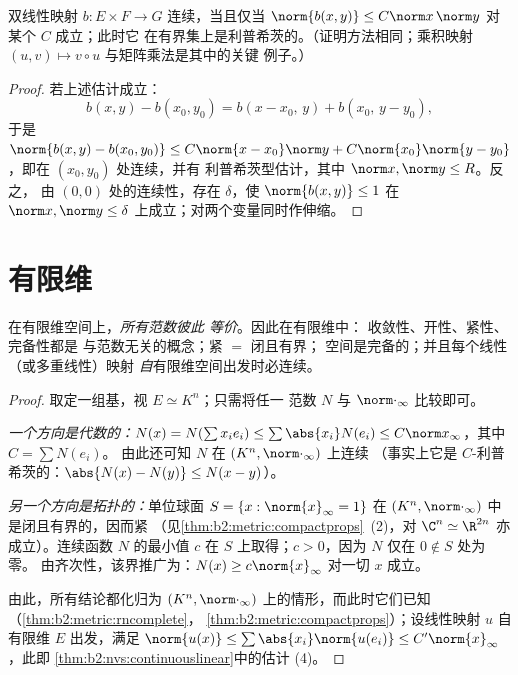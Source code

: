 \begin{proposition}[双线性映射]\label{prop:b2:nvs:bilinear}
双线性映射 $b \colon E \times F \to G$ 连续，当且仅当
$\norm{b(x,y)} \leq C\norm x\,\norm y$ 对某个 $C$ 成立；此时它
在有界集上是利普希茨的。（证明方法相同；乘积映射
$(u, v) \mapsto v \circ u$ 与矩阵乘法是其中的关键
例子。）
\end{proposition}

\begin{proof}
若上述估计成立：
\[
b(x,y) - b(x_0,y_0) = b(x - x_0,\, y) + b(x_0,\, y - y_0),
\]
于是 $\norm{b(x,y) - b(x_0,y_0)} \leq C\norm{x - x_0}\norm y +
C\norm{x_0}\norm{y - y_0}$，即在 $(x_0, y_0)$ 处连续，并有
利普希茨型估计，其中 $\norm x, \norm y \leq R$。反之，
由 $(0,0)$ 处的连续性，存在 $\delta$，使 $\norm{b(x,y)} \leq 1$ 在
$\norm x, \norm y \leq \delta$ 上成立；对两个变量同时作伸缩。
\end{proof}

\section{有限维}

\begin{theorem}[有限维空间中范数的等价性]\label{thm:b2:nvs:finitedim}
在有限维空间上，\emph{所有范数彼此
等价}。因此在有限维中：
收敛性、开性、紧性、完备性都是
与范数无关的概念；紧 $=$ 闭且有界；
空间是完备的；并且每个线性（或多重线性）映射
\emph{自}有限维空间出发时必连续。
\end{theorem}

\begin{proof}
取定一组基，视 $E \simeq K^n$；只需将任一
范数 $N$ 与 $\norm\cdot_\infty$ 比较即可。

\emph{一个方向是代数的：}$N(x) = N(\sum x_i e_i) \leq
\sum \abs{x_i} N(e_i) \leq C \norm x_\infty$，其中 $C = \sum N(e_i)$。
由此还可知 $N$ 在 $(K^n, \norm\cdot_\infty)$ 上连续
（事实上它是 $C$-利普希茨的：$\abs{N(x) - N(y)} \leq N(x - y)$）。

\emph{另一个方向是拓扑的：}单位球面 $S = \{x :
\norm{x}_\infty = 1\}$ 在 $(K^n,
\norm\cdot_\infty)$ 中是闭且有界的，因而紧
（见\cref{thm:b2:metric:compactprops}~(2)，对 $\C^n \simeq
\R^{2n}$ 亦成立）。连续函数 $N$ 的最小值 $c$ 在
$S$ 上取得；$c > 0$，因为 $N$ 仅在 $0 \notin S$ 处为零。
由齐次性，该界推广为：$N(x) \geq c \norm{x}_\infty$ 对一切 $x$ 成立。

由此，所有结论都化归为 $(K^n,
\norm\cdot_\infty)$ 上的情形，而此时它们已知
（\cref{thm:b2:metric:rncomplete}，
\cref{thm:b2:metric:compactprops}）；设线性映射 $u$ 自
有限维 $E$ 出发，满足 $\norm{u(x)} \leq \sum\abs{x_i}
\norm{u(e_i)} \leq C'\norm{x}_\infty$，此即
\cref{thm:b2:nvs:continuouslinear}中的估计 (4)。
\end{proof}

